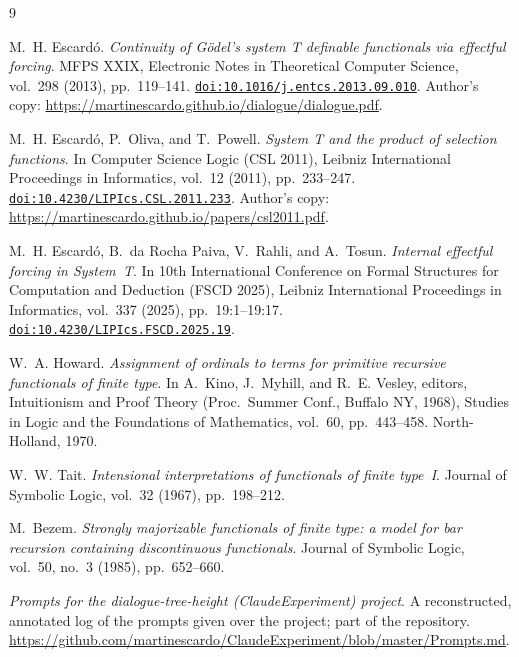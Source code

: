 \documentclass[11pt]{article}
\theoremstyle{definition}
\begin{document}
\begin{thebibliography}{9}

M.~H. Escardó.
\emph{Continuity of Gödel's system T definable functionals via effectful forcing}.
MFPS XXIX, Electronic Notes in Theoretical Computer Science, vol.~298 (2013),
pp.~119--141.
\href{https://doi.org/10.1016/j.entcs.2013.09.010}{\texttt{doi:10.1016/j.entcs.2013.09.010}}.
Author's copy: \url{https://martinescardo.github.io/dialogue/dialogue.pdf}.

M.~H. Escardó, P.~Oliva, and T.~Powell.
\emph{System T and the product of selection functions}.
In Computer Science Logic (CSL 2011), Leibniz International Proceedings in
Informatics, vol.~12 (2011), pp.~233--247.
\href{https://doi.org/10.4230/LIPIcs.CSL.2011.233}{\texttt{doi:10.4230/LIPIcs.CSL.2011.233}}.
Author's copy: \url{https://martinescardo.github.io/papers/csl2011.pdf}.

M.~H. Escardó, B.~da Rocha Paiva, V.~Rahli, and A.~Tosun.
\emph{Internal effectful forcing in System~T}.
In 10th International Conference on Formal Structures for Computation and
Deduction (FSCD 2025), Leibniz International Proceedings in Informatics,
vol.~337 (2025), pp.~19:1--19:17.
\href{https://doi.org/10.4230/LIPIcs.FSCD.2025.19}{\texttt{doi:10.4230/LIPIcs.FSCD.2025.19}}.

W.~A. Howard.
\emph{Assignment of ordinals to terms for primitive recursive functionals of
finite type}.
In A.~Kino, J.~Myhill, and R.~E. Vesley, editors, Intuitionism and Proof Theory
(Proc.\ Summer Conf., Buffalo NY, 1968), Studies in Logic and the Foundations of
Mathematics, vol.~60, pp.~443--458. North-Holland, 1970.

W.~W. Tait.
\emph{Intensional interpretations of functionals of finite type~I}.
Journal of Symbolic Logic, vol.~32 (1967), pp.~198--212.

M.~Bezem.
\emph{Strongly majorizable functionals of finite type: a model for bar recursion
containing discontinuous functionals}.
Journal of Symbolic Logic, vol.~50, no.~3 (1985), pp.~652--660.

\emph{Prompts for the dialogue-tree-height (ClaudeExperiment) project}.
A reconstructed, annotated log of the prompts given over the project; part of the
repository.
\url{https://github.com/martinescardo/ClaudeExperiment/blob/master/Prompts.md}.

\end{thebibliography}
\end{document}
